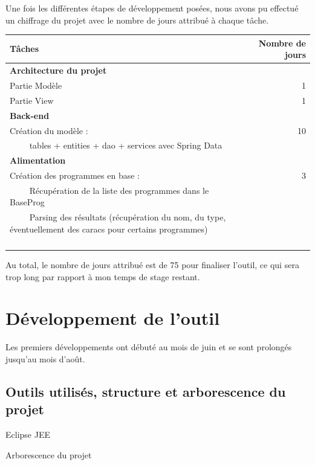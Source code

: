 \documentclass{polytech/polytech}
\begin{document}
Une fois les différentes étapes de développement posées, nous avons pu effectué un chiffrage du projet avec le nombre de jours attribué à chaque tâche.

\begin{tabular}{|l|r|}
	\hline 
	\textbf{Tâches}	& \textbf{Nombre de jours} \\ 
	\hline
	\hline 
	\textbf{Architecture du projet} &  \\ 
	Partie Modèle	& 1 \\
	Partie View 	& 1 \\ 
	\hline 
	\textbf{Back-end}	&  \\ 
	Création du modèle : & 10 \\
	~~\llap{\textbullet}~~ tables + entities + dao + services avec Spring Data &  \\ 
	\hline 
	\textbf{Alimentation}	&  \\ 
	Création des programmes en base : & 3 \\
	~~\llap{\textbullet}~~ Récupération de la liste des programmes dans le BaseProg &  \\ 
	~~\llap{\textbullet}~~ Parsing des résultats (récupération du nom, du type, éventuellement des caracs pour certains programmes) &  \\ 
	
	\hline 
	&  \\ 
	\hline 
	&  \\ 
	\hline 
	&  \\ 
	\hline 
	&  \\ 
	\hline 
\end{tabular} 


Au total, le nombre de jours attribué est de 75 pour finaliser l'outil, ce qui sera trop long par rapport à mon temps de stage restant. 

\part{Développement de l'outil}
\label{part:dev}

Les premiers développements ont débuté au mois de juin et se sont prolongés jusqu'au mois d'août.


\chapter{Outils utilisés, structure et arborescence du projet}

Eclipse JEE

Arborescence du projet
\end{document}
